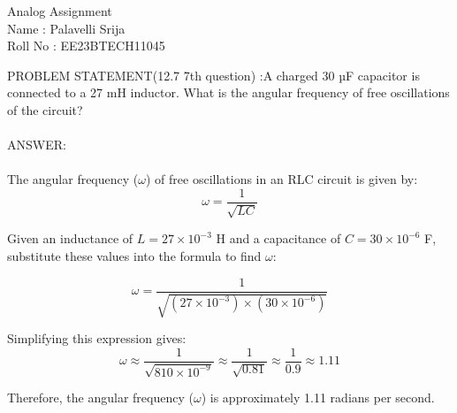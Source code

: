 \documentclass{article}
\begin{document}
\begin{center}
Analog Assignment\\
Name : Palavelli Srija\\
Roll No : EE23BTECH11045\\
\end{center}
PROBLEM STATEMENT(12.7 7th question) :A charged 30 µF capacitor is connected to a 27 mH inductor. What is
the angular frequency of free oscillations of the circuit?\\ \\
ANSWER:\\
\\The angular frequency (\(\omega\)) of free oscillations in an RLC circuit is given by:
\[ \omega = \frac{1}{\sqrt{LC}} \]

Given an inductance of \(L = 27 \times 10^{-3}\) H and a capacitance of \(C = 30 \times 10^{-6}\) F, substitute these values into the formula to find \(\omega\):

\[ \omega = \frac{1}{\sqrt{(27 \times 10^{-3}) \times (30 \times 10^{-6})}} \]

Simplifying this expression gives:
\[ \omega \approx \frac{1}{\sqrt{810 \times 10^{-9}}} \approx \frac{1}{\sqrt{0.81}} \approx \frac{1}{0.9} \approx 1.11 \]

Therefore, the angular frequency (\(\omega\)) is approximately 1.11 radians per second.
\end{document}
